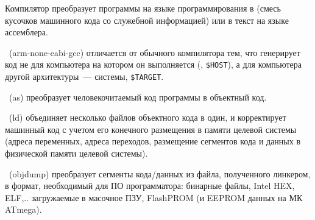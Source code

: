 
  Компилятор преобразует программы на языке программирования в  (смесь кусочков машинного кода со служебной информацией) или в
  текст на языке ассемблера.
  
  \ (arm-none-eabi-gcc) отличается от обычного
  компилятора тем, что генерирует код не для компьютера на котором он выполняется
  (, \verb|$HOST|), а для компьютера другой
  архитектуры\ ---  системы, \verb|$TARGET|.
  
  \ (as) преобразует человекочитаемый код программы в объектный
  код.
  
  \ (ld) объединяет несколько файлов объектного кода в один,
  и корректирует машинный код с учетом его конечного размещения в памяти
  целевой системы (адреса переменных, адреса переходов, размещение сегментов
  кода и данных в физической памяти целевой системы).
  
  \ (objdump) преобразует сегменты кода/данных из файла,
  полученного линкером, в формат, необходимый для ПО программатора: бинарные файлы, Intel
  HEX, ELF,.. загружаемые в масочное ПЗУ, FlashPROM (и EEPROM данных на МК
  ATmega).
  
